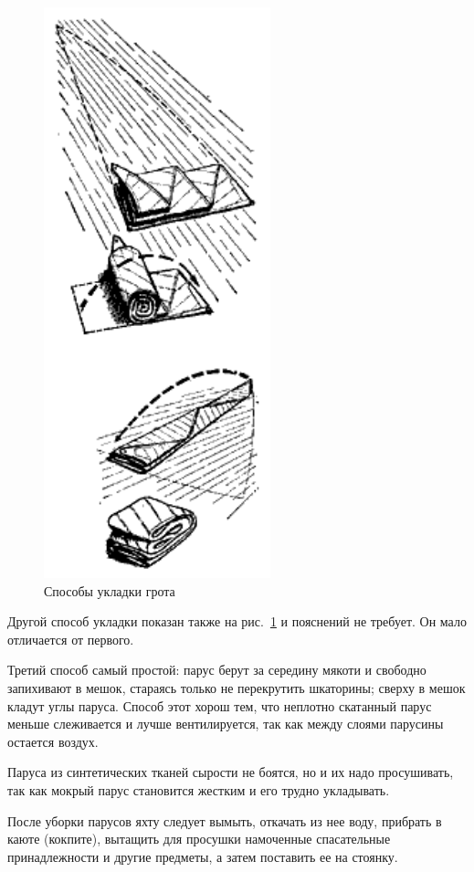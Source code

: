 \documentclass[a4paper, 12pt, twoside, final]{scrbook}
\begin{document}
\begin{figure}
   \centering
   \includegraphics{104_Sposoby_ukladki_grota} %
   \caption{Способы укладки грота}
   \label{fig:104}
\end{figure}

Другой способ укладки показан также на рис.~\ref{fig:104} и пояснений не требует. Он мало отличается от первого.

Третий способ самый простой: парус берут за середину мякоти и свободно запихивают в мешок, стараясь только не перекрутить шкаторины; сверху в мешок кладут углы паруса. Способ этот хорош тем, что неплотно скатанный парус меньше слеживается и лучше вентилируется, так как между слоями парусины остается воздух.

Паруса из синтетических тканей сырости не боятся, но и их надо просушивать, так как мокрый парус становится жестким и его трудно укладывать.

После уборки парусов яхту следует вымыть, откачать из нее воду, прибрать в каюте (кокпите), вытащить для просушки намоченные спасательные принадлежности и другие предметы, а затем поставить ее на стоянку.
\end{document}
